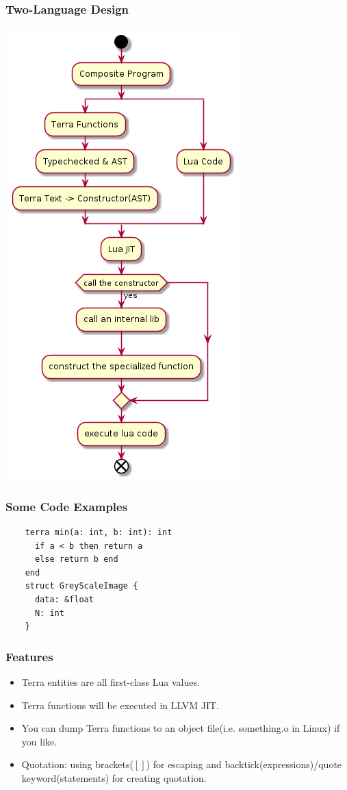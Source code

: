 \documentclass{beamer}
\begin{document}
\begin{frame}
	\frametitle{Two-Language Design}
  \includegraphics[scale=0.3]{terra.png}
\end{frame}

\begin{frame}[fragile]
	\frametitle{Some Code Examples}
  \begin{lstlisting}
    terra min(a: int, b: int): int
      if a < b then return a
      else return b end
    end
    struct GreyScaleImage {
      data: &float
      N: int
    }
  \end{lstlisting}
\end{frame}

\begin{frame}
	\frametitle{Features}
  \begin{itemize}
  \item Terra entities are all first-class Lua values.\pause
  \item Terra functions will be executed in LLVM JIT.\pause
  \item You can dump Terra functions to an object file(i.e. something.o in Linux) if you like.\pause
  \item Quotation: using brackets($[]$) for escaping and backtick(expressions)/quote keyword(statements) for creating quotation.
  \end{itemize}
\end{frame}
\end{document}
